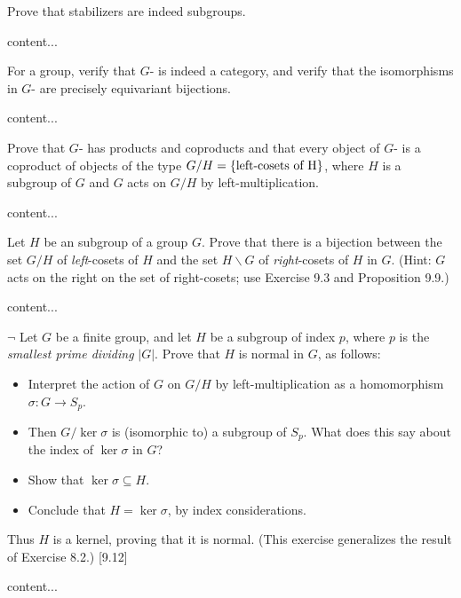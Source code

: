 \begin{exercise}
	Prove that stabilizers are indeed subgroups.
\end{exercise}
\begin{solution}
	content...
\end{solution}

\begin{exercise}
	For a group, verify that $G$- is indeed a category, and verify that the isomorphisms in $G$- are precisely equivariant bijections.
\end{exercise}
\begin{solution}
	content...
\end{solution}

\begin{exercise}
	Prove that $G$- has products and coproducts and that every object of $G$- is a coproduct of objects of the type $G/H=\{\textnormal{left-cosets of H}\}$, where $H$ is a subgroup of $G$ and $G$ acts on $G/H$ by left-multiplication.
\end{exercise}
\begin{solution}
	content...
\end{solution}

\begin{exercise}
	Let $H$ be an subgroup of a group $G$. Prove that there is a bijection between the set $G/H$ of \emph{left}-cosets of $H$ and the set $H\backslash G$ of \emph{right}-cosets of $H$ in $G$. (Hint: $G$ acts on the right on the set of right-cosets; use Exercise 9.3 and Proposition 9.9.) 
\end{exercise}
\begin{solution}
	content...
\end{solution}

\begin{exercise}
	$\neg$ Let $G$ be a finite group, and let $H$ be a subgroup of index $p$, where $p$ is the \emph{smallest prime dividing} $|G|$. Prove that $H$ is normal in $G$, as follows:
	\begin{itemize}
		\item Interpret the action of $G$ on $G/H$ by left-multiplication as a homomorphism $\sigma\colon G \to S_p$.
		\item Then $G/\ker \sigma$ is (isomorphic to) a subgroup of $S_p$. What does this say about the index of $\ker\sigma$ in $G$?
		\item Show that $\ker \sigma\subseteq H$.
		\item Conclude that $H= \ker\sigma$, by index considerations.
	\end{itemize}
	Thus $H$ is a kernel, proving that it is normal. (This exercise generalizes the result of Exercise 8.2.) [9.12]
\end{exercise}
\begin{solution}
	content...
\end{solution}

